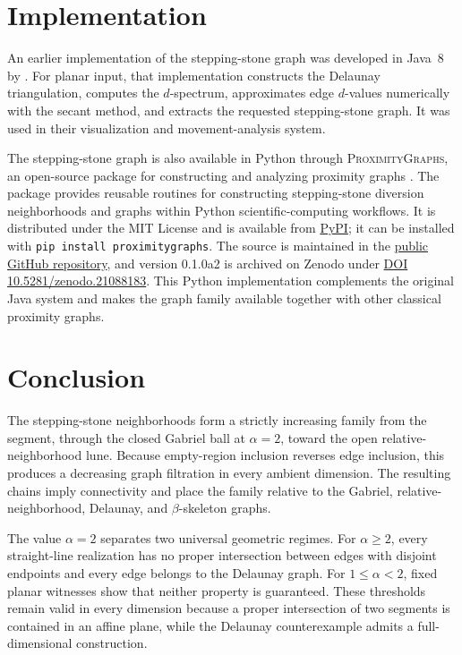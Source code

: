 \documentclass[a4paper,fleqn]{cas-sc}
\theoremstyle{definition}
\theoremstyle{remark}
\newcommand{\0}{\mathbf{0}}
\begin{document}
\section{Implementation}
\label{sec:implementation}

An earlier implementation of the stepping-stone graph was developed in
Java~8 by \citet[Sec.~4.2]{kannangara2018stepping}. For planar input, that
implementation constructs the Delaunay triangulation, computes the
\(d\)-spectrum, approximates edge \(d\)-values numerically with the secant
method, and extracts the requested stepping-stone graph. It was used in their
visualization and movement-analysis system.

The stepping-stone graph is also available in Python through
\textsc{ProximityGraphs}, an open-source package for constructing and
analyzing proximity graphs \citep{maravillo2026proximitygraphs}. The package
provides reusable routines for constructing stepping-stone diversion
neighborhoods and graphs within Python scientific-computing workflows. It is
distributed under the MIT License and is available from
\href{https://pypi.org/project/proximitygraphs/}{PyPI}; it can be installed
with \texttt{pip install proximitygraphs}. The source is maintained in the
\href{https://github.com/HectorMaravillo/ProximityGraphs}{public GitHub
repository}, and version 0.1.0a2 is archived on Zenodo under
\href{https://doi.org/10.5281/zenodo.21088183}{DOI
10.5281/zenodo.21088183}. This Python implementation complements the original
Java system and makes the graph family available together with other
classical proximity graphs.

\section{Conclusion}
\label{sec:conclusion}

The stepping-stone neighborhoods form a strictly increasing family from the
segment, through the closed Gabriel ball at \(\alpha=2\), toward the open
relative-neighborhood lune. Because empty-region inclusion reverses edge
inclusion, this produces a decreasing graph filtration in every ambient
dimension. The resulting chains imply connectivity and place the family
relative to the Gabriel, relative-neighborhood, Delaunay, and
\(\beta\)-skeleton graphs.

The value \(\alpha=2\) separates two universal geometric regimes. For
\(\alpha\geq2\), every straight-line realization has no proper
intersection between edges with disjoint endpoints and every edge belongs to
the Delaunay graph. For \(1\leq\alpha<2\), fixed planar witnesses show that
neither property is guaranteed. These thresholds remain valid in every
dimension because a proper intersection of two segments is contained in an
affine plane, while the Delaunay counterexample admits a full-dimensional
construction.
\end{document}
